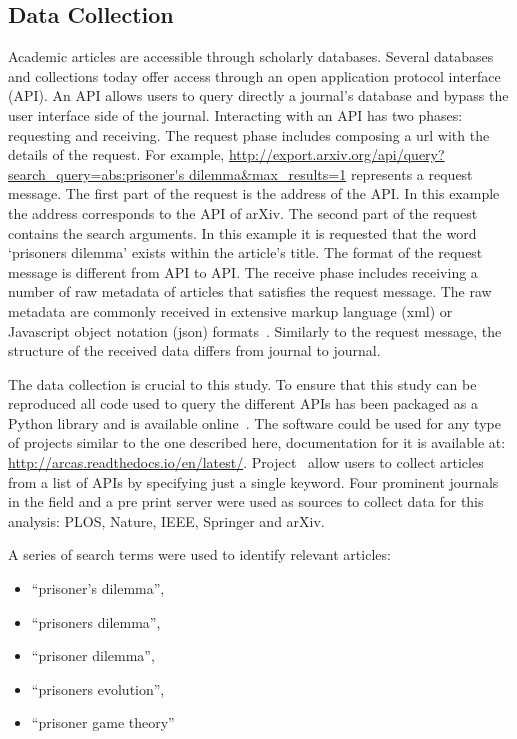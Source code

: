 \documentclass{article}
\theoremstyle{definition}
\begin{document}
\subsection{Data Collection}\label{section:data_collection}

Academic articles are accessible through scholarly databases.
Several databases and collections today offer access through
an open application protocol interface (API). An API allows users to query
directly a journal's database and bypass the user interface side of the journal.
Interacting with an API has two phases: requesting and receiving.
The request phase includes composing a url with the details of the request. For
example, \url{http://export.arxiv.org/api/query?search_query=abs:prisoner's dilemma&max_results=1}
represents a request message. The first part of the request is the address
of the API.
In this example the address corresponds to the API of arXiv.
The second part of the request contains the search arguments. In this example 
it is requested that the word `prisoners dilemma' exists within the article's title.
The format of the request message is different from API to API.
The receive phase includes receiving a number of raw metadata of articles that
satisfies the request message. The raw metadata are commonly received in extensive markup
language (xml) or Javascript object notation (json) formats~\cite{nurseitov2009}.
Similarly to the request message, the structure of the received data differs from journal
to journal.

The data collection is crucial to this study. To ensure that this study can be
reproduced all code used to query the different APIs has been packaged as a Python library and is
available online~\cite{nikoleta_2017}. The software could be used for any type of
projects similar to the one described here, documentation for it is available at:
\url{http://arcas.readthedocs.io/en/latest/}.
Project~\cite{nikoleta_2017} allow users to collect articles from a list of APIs by
specifying just a single keyword. Four prominent journals in the field and a
pre print server were used as sources to collect data for this analysis:
PLOS, Nature, IEEE, Springer and arXiv.

A series of search terms were used to identify relevant articles:

\begin{itemize}
    \item ``prisoner's dilemma'',
    \item ``prisoners dilemma'',
    \item ``prisoner dilemma'',
    \item ``prisoners evolution'',
    \item ``prisoner game theory''
\end{itemize}
\end{document}
